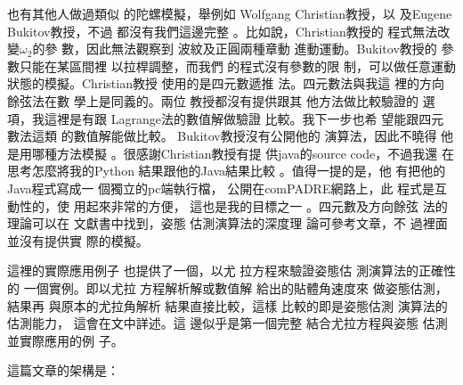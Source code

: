 \documentclass[12pt,twoside]{article}
\begin{document}
\bigskip

也有其他人做過類似%
的陀螺模擬，舉例如%
Wolfgang Christian教授\cite{wolfgangSimMeth}，以%
及Eugene Bukitov教授\cite{eugene}，不過%
都沒有我們這邊完整%
。比如說，Christian教授的%
程式無法改變$\omega _{2}$的參%
數，因此無法觀察到%
波紋及正圓兩種章動%
進動運動。Bukitov教授的%
參數只能在某區間裡%
以拉桿調整，而我們%
的程式沒有參數的限%
制，可以做任意運動%
狀態的模擬。Christian教授%
使用的是四元數遞推%
法。四元數法與我這%
裡的方向餘弦法在數%
學上是同義的。兩位%
教授都沒有提供跟其%
他方法做比較驗證的%
選項，我這裡是有跟%
Lagrange法的數值解做驗證%
比較。我下一步也希%
望能跟四元數法這類%
的數值解能做比較。%
Bukitov教授沒有公開他的%
演算法，因此不曉得%
他是用哪種方法模擬%
。很感謝Christian教授有提%
供java的source code，不過我還%
在思考怎麼將我的Python%
結果跟他的Java結果比較%
。值得一提的是，他%
有把他的Java程式寫成一%
個獨立的pc端執行檔，%
公開在comPADRE網路上，此%
程式是互動性的，使%
用起來非常的方便，%
這也是我的目標之一%
。四元數及方向餘弦%
法的理論可以在\cite{rapaport}%
文獻書中找到，姿態%
估測演算法的深度理%
論可參考文章\cite{savage}，不%
過裡面並沒有提供實%
際的模擬。

這裡的實際應用例子%
也提供了一個，以尤%
拉方程來驗證姿態估%
測演算法的正確性的%
一個實例。即以尤拉%
方程解析解或數值解%
給出的貼體角速度來%
做姿態估測，結果再%
與原本的尤拉角解析%
結果直接比較，這樣%
比較的即是姿態估測%
演算法的估測能力，%
這會在文中詳述。這%
邊似乎是第一個完整%
結合尤拉方程與姿態%
估測並實際應用的例%
子。

這篇文章的架構是：
\end{document}
